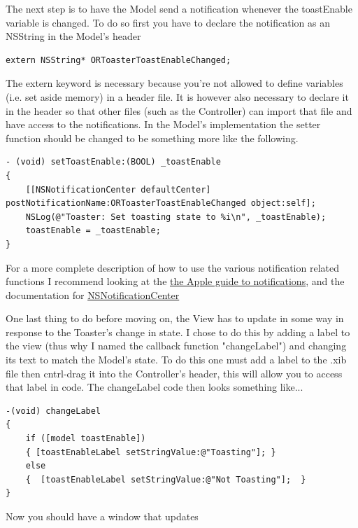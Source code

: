 \documentclass[12pt,a4paper]{article}
\begin{document}
The next step is to have the Model send a notification whenever the toastEnable variable is changed.
To do so first you have to declare the notification as an NSString in the Model's header 
\begin{lstlisting}
extern NSString* ORToasterToastEnableChanged;
\end{lstlisting}
The extern keyword is necessary because you're not allowed to define variables (i.e. set aside memory) in a header file.
It is however also necessary to declare it in the header so that other files (such as the Controller) can import that file and have access to the notifications.
In the Model's implementation the setter function should be changed to be something more like the following.
\begin{lstlisting}
- (void) setToastEnable:(BOOL) _toastEnable
{
    [[NSNotificationCenter defaultCenter] postNotificationName:ORToasterToastEnableChanged object:self];
    NSLog(@"Toaster: Set toasting state to %i\n", _toastEnable);
    toastEnable = _toastEnable;
}
\end{lstlisting}
For a more complete description of how to use the various notification related functions I recommend looking at the \href{https://developer.apple.com/library/mac/documentation/Cocoa/Conceptual/Notifications/Introduction/introNotifications.html#//apple_ref/doc/uid/10000043i}
{the Apple guide to notifications}, 
and the documentation for \href{https://developer.apple.com/library/mac/documentation/Cocoa/Reference/Foundation/Classes/NSNotificationCenter_Class/#//apple_ref/occ/instm/NSNotificationCenter/postNotification}{NSNotificationCenter}

One last thing to do before moving on, the View has to update in some way in response to the Toaster's change in state. 
I chose to do this by adding a label to the view (thus why I named the callback function "changeLabel") and changing its text to match the Model's state.
To do this one must add a label to the .xib file then cntrl-drag it into the Controller's header, this will allow you to access that label in code.
The changeLabel code then looks something like...
\begin{lstlisting}
-(void) changeLabel
{
    if ([model toastEnable])
    { [toastEnableLabel setStringValue:@"Toasting"]; }
    else
    {  [toastEnableLabel setStringValue:@"Not Toasting"];  }
}
\end{lstlisting}

Now you should have a window that updates 
\end{document}
